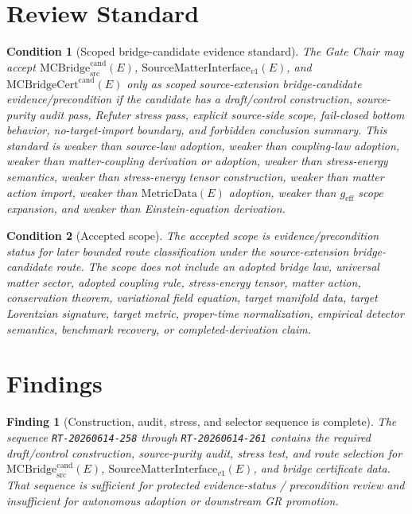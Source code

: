 \documentclass[11pt]{article}
\newcommand{\MetricData}{\mathrm{MetricData}}
\newcommand{\geff}{g_{\mathrm{eff}}}
\newcommand{\MCBridgeCand}{\mathrm{MCBridge}_{\mathrm{src}}^{\mathrm{cand}}}
\newcommand{\MCBridgeCertCand}{\mathrm{MCBridgeCert}^{\mathrm{cand}}}
\newcommand{\SMI}{\mathrm{SourceMatterInterface}_{v1}}
\newtheorem{finding}{Finding}
\newtheorem{condition}{Condition}
\begin{document}
\section{Review Standard}

\begin{condition}[Scoped bridge-candidate evidence standard]
The Gate Chair may accept \(\MCBridgeCand(E)\), \(\SMI(E)\), and
\(\MCBridgeCertCand(E)\) only as scoped source-extension bridge-candidate
evidence/precondition if the candidate has a draft/control construction,
source-purity audit pass, Refuter stress pass, explicit source-side scope,
fail-closed bottom behavior, no-target-import boundary, and forbidden
conclusion summary. This standard is weaker than source-law adoption, weaker
than coupling-law adoption, weaker than matter-coupling derivation or
adoption, weaker than stress-energy semantics, weaker than stress-energy
tensor construction, weaker than matter action import, weaker than
\(\MetricData(E)\) adoption, weaker than \(\geff\) scope expansion, and
weaker than Einstein-equation derivation.
\end{condition}

\begin{condition}[Accepted scope]
The accepted scope is evidence/precondition status for later bounded route
classification under the source-extension bridge-candidate route. The scope
does not include an adopted bridge law, universal matter sector, adopted
coupling rule, stress-energy tensor, matter action, conservation theorem,
variational field equation, target manifold data, target Lorentzian signature,
target metric, proper-time normalization, empirical detector semantics,
benchmark recovery, or completed-derivation claim.
\end{condition}

\section{Findings}

\begin{finding}[Construction, audit, stress, and selector sequence is complete]
The sequence \texttt{RT-20260614-258} through \texttt{RT-20260614-261}
contains the required draft/control construction, source-purity audit, stress
test, and route selection for \(\MCBridgeCand(E)\), \(\SMI(E)\), and bridge
certificate data. That sequence is sufficient for protected evidence-status /
precondition review and insufficient for autonomous adoption or downstream GR
promotion.
\end{finding}
\end{document}

